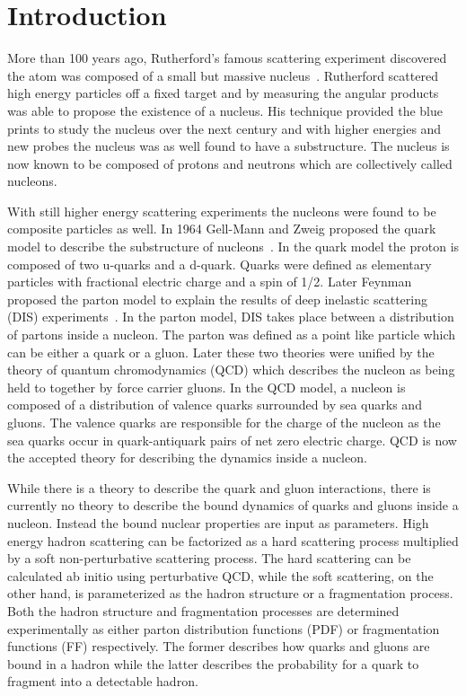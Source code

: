 \chapter{Introduction} \label{ch::intro}

More than 100 years ago, Rutherford's famous scattering experiment discovered
the atom was composed of a small but massive nucleus~\cite{Rutherford:1911zz}.
Rutherford scattered high energy particles off a fixed target and by measuring
the angular products was able to propose the existence of a nucleus.  His
technique provided the blue prints to study the nucleus over the next century
and with higher energies and new probes the nucleus was as well found to have a
substructure.  The nucleus is now known to be composed of protons
and neutrons which are collectively called nucleons.

With still higher energy scattering experiments the nucleons were found to be
composite particles as well.  In 1964 Gell-Mann and Zweig proposed the quark
model to describe the substructure of
nucleons~\cite{GellMann:1964nj,Zweig:1964jf}.  In the quark model the proton is
composed of two u-quarks and a d-quark.  Quarks were defined as elementary
particles with fractional electric charge and a spin of 1/2.  Later Feynman
proposed the parton model to explain the results of deep inelastic scattering
(DIS) experiments~\cite{PhysRevLett.23.1415}.  In the parton model, DIS takes
place between a distribution of partons inside a nucleon.  The parton was
defined as a point like particle which can be either a quark or a gluon.  Later
these two theories were unified by the theory of quantum chromodynamics (QCD)
which describes the nucleon as being held to together by force carrier gluons.
In the QCD model, a nucleon is composed of a distribution of valence quarks
surrounded by sea quarks and gluons.  The valence quarks are responsible for the
charge of the nucleon as the sea quarks occur in quark-antiquark pairs of net
zero electric charge.  QCD is now the accepted theory for describing the
dynamics inside a nucleon.

While there is a theory to describe the quark and gluon interactions, there is
currently no theory to describe the bound dynamics of quarks and gluons inside a
nucleon.  Instead the bound nuclear properties are input as parameters.  High
energy hadron scattering can be factorized as a hard scattering process
multiplied by a soft non-perturbative scattering process.  The hard scattering
can be calculated ab initio using perturbative QCD, while the soft scattering,
on the other hand, is parameterized as the hadron structure or a fragmentation
process.  Both the hadron structure and fragmentation processes are determined
experimentally as either parton distribution functions (PDF) or fragmentation
functions (FF) respectively.  The former describes how quarks and gluons are
bound in a hadron while the latter describes the probability for a quark to
fragment into a detectable hadron.

